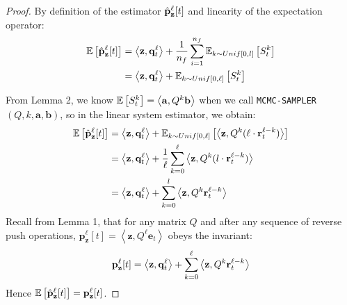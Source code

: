 \begin{proof}
By definition of the estimator $\hat{\mathbf{p}}_\mathbf{z}^{\ell}[t]$ and linearity of the expectation operator:
\begin{align*}
\mathbb{E}\left[\hat{\mathbf{p}}_\mathbf{z}^{\ell}[t]\right] &= \left<\mathbf{z}, \mathbf{q}_t^{\ell} \right> + \frac{1}{n_f}\sum_{i=1}^{n_f} \mathbb{E}_{k \sim Unif[0, l]}\left[S_{t}^{k}\right] \\
&= \left<\mathbf{z}, \mathbf{q}_t^{\ell} \right> + \mathbb{E}_{k \sim Unif[0, \ell]}\left[S_{t}^{k}\right]
\end{align*}

From Lemma 2, we know $\mathbb{E}\left[S_{t}^{k}\right] = \left< \mathbf{a}, Q^k \mathbf{b} \right>$ when we call \texttt{MCMC-SAMPLER}$(Q, k, \mathbf{a}, \mathbf{b})$, so in the linear system estimator, we obtain: 
\begin{align*}
\mathbb{E}\left[\hat{\mathbf{p}}_\mathbf{z}^{\ell}[t] \right] &= \left<\mathbf{z}, \mathbf{q}_t^{\ell} \right> + \mathbb{E}_{k \sim Unif[0, \ell]} \left[\left< \mathbf{z}, Q^k ( \ell \cdot \mathbf{r}_t^{\ell-k}) \right> \right] \\
&= \left<\mathbf{z}, \mathbf{q}_t^{\ell} \right> + \frac{1}{\ell} \sum_{k = 0}^\ell\left< \mathbf{z}, Q^k ( l \cdot \mathbf{r}_t^{\ell-k} ) \right>\\
&= \left<\mathbf{z}, \mathbf{q}_t^{\ell} \right> + \sum_{k = 0}^l\left< \mathbf{z}, Q^k\mathbf{r}_t^{\ell-k} \right>
\end{align*}
Recall from Lemma 1, that for any matrix $Q$ and after any sequence of reverse push operations, $\mathbf{p}_\mathbf{z}^{\ell}[t] = \left<\mathbf{z}, Q^{\ell} \mathbf{e}_t \right>$ obeys the invariant: 
$${\mathbf{p}}_\mathbf{z}^{\ell}[t] = \left<\mathbf{z}, \mathbf{q}_t^{\ell} \right> + \sum_{k=0}^{\ell} \left<\mathbf{z}, Q^k\mathbf{r}_t^{\ell-k}\right>$$
Hence $\mathbb{E}\left[\hat{\mathbf{p}}_\mathbf{z}^{\ell}[t] \right] = {\mathbf{p}}_\mathbf{z}^{\ell}[t]$.
\end{proof}
